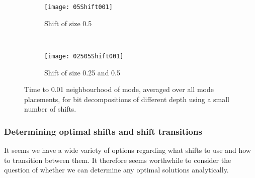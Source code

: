 \begin{figure}[h]
    \centering
    \begin{subfigure}[t]{0.48\textwidth}
      \texttt{[image: 05Shift001]}
      \caption{Shift of size 0.5}
    \end{subfigure}
    ~
    \begin{subfigure}[t]{0.48\textwidth}
      \texttt{[image: 02505Shift001]}
      \caption{Shift of size 0.25 and 0.5}
    \end{subfigure}
    \caption{Time to 0.01 neighbourhood of mode, averaged over all mode placements, for bit decompositions of different depth using a small number of shifts.}
    \label{fig:fewShifts}
\end{figure}

\subsubsection{Determining optimal shifts and shift transitions}
It seems we have a wide variety of options regarding what shifts to use and how to transition between them. It therefore seems worthwhile to consider the question of whether we can determine any optimal solutions analytically. 


